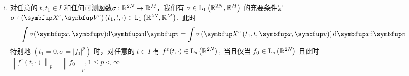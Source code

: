 \begin{lemma}
\begin{enumerate}[(i)]
    \item  %
    对任意的 $t, t_{1} \in I$ 和任何可测函数$\sigma: {\mathbb{R}}^{2N} \rightarrow {\mathbb{R}}^{M}$，我们有 $\sigma \in \mathrm{L}_{1}\left({\mathbb{R}}^{2N}, {\mathbb{R}}^{M}\right)$ 的充要条件是 $\sigma \circ (\vect{X}^{\varepsilon},\vect{V}^{\varepsilon})\left(t_{1}, t, \cdot\right) \in \mathrm{L}_{1}\left(\bbR^{2N}, \bbR^{M}\right) .$ 此时
$$\int \sigma(\vx, \vv) \mathrm{d} \vx \mathrm{d} \vv=\int \sigma\left(\vect{X}^{\varepsilon}\left(t_{1}, t, \vx, \vv\right)\right) \mathrm{d} \vx \mathrm{d} \vv$$
特别地 $\left(t_{1}=0, \sigma=|f_{0}|^{p}\right)$ 时，对任意的 $t \in I$ 有 $f^{\varepsilon}(t, \cdot) \in \mathrm{L}_{p}\left({\mathbb{R}}^{2N}\right),$ 当且仅当 $f_{0} \in \mathrm{L}_{p}\left({\mathbb{R}}^{2N}\right)$ 且此时 
$\left.\left\|\left.f^{\varepsilon}(t, \cdot)\right\|_{p}=\right\| f_{0}\right\|_{p}, 1 \leqslant p<\infty$



\end{enumerate}
\end{lemma}

